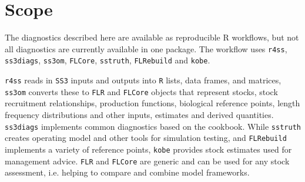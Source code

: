 \documentclass[11pt,a4paper]{article}
\begin{document}
\section{Scope}

The diagnostics described here are available as reproducible R workflows, but not all diagnostics are currently available in one package. The workflow uses \texttt{r4ss}, \texttt{ss3diags}, \texttt{ss3om}, \texttt{FLCore}, \texttt{sstruth}, \texttt{FLRebuild} and \texttt{kobe}.

\texttt{r4ss} reads in \texttt{SS3} inputs and outputs into \texttt{R} lists, data frames, and matrices, \texttt{ss3om} converts these to \texttt{FLR} and \texttt{FLCore} objects that represent stocks, stock recruitment relationships, production functions, biological reference points, length frequency distributions and other inputs, estimates and derived quantities. \texttt{ss3diags} implements common diagnostics based on the cookbook. While \texttt{sstruth} creates operating model and other tools for simulation testing, and \texttt{FLRebuild} implements a variety of reference points, \texttt{kobe} provides stock estimates used for management advice. \texttt{FLR} and \texttt{FLCore} are generic and can be used for any stock assessment, i.e. helping to compare and combine model frameworks.
\end{document}
